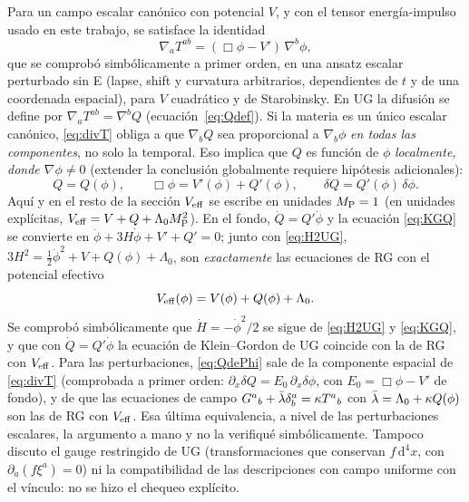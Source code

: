 Para un campo escalar canónico con potencial $V$, y con el tensor energía-impulso usado en este trabajo, se satisface la identidad
\begin{equation}
\nabla_aT^{ab}=(\Box\phi-V')\,\nabla^b\phi,
\label{eq:divT}
\end{equation}
que se comprobó simbólicamente a primer orden, en una ansatz escalar perturbado sin E (lapse, shift y curvatura arbitrarios, dependientes de $t$ y de una coordenada espacial), para $V$ cuadrático y de Starobinsky. En UG la difusión se define por $\nabla_aT^{ab}=\nabla^bQ$ (ecuación~\eqref{eq:Qdef}). Si la materia es un único escalar canónico, \eqref{eq:divT} obliga a que $\nabla_bQ$ sea proporcional a $\nabla_b\phi$ \emph{en todas las componentes}, no solo la temporal. Eso implica que $Q$ es función de $\phi$ \emph{localmente, donde $\nabla\phi\neq0$} (extender la conclusión globalmente requiere hipótesis adicionales):
\begin{equation}
Q=Q(\phi),\qquad \Box\phi=V'(\phi)+Q'(\phi),\qquad \delta Q=Q'(\phi)\,\delta\phi.
\label{eq:QdePhi}
\end{equation}
Aquí y en el resto de la sección $V_{\rm eff}$ se escribe en unidades $M_{\rm P}=1$ (en unidades explícitas, $V_{\rm eff}=V+Q+\Lambda_0M_{\rm P}^2$). En el fondo, $\dot Q=Q'\dot\phi$ y la ecuación \eqref{eq:KGQ} se convierte en $\ddot\phi+3H\dot\phi+V'+Q'=0$; junto con \eqref{eq:H2UG}, $3H^2=\tfrac12\dot\phi^2+V+Q(\phi)+\Lambda_0$, son \emph{exactamente} las ecuaciones de RG con el potencial efectivo
\begin{equation}
V_{\rm eff}(\phi)=V(\phi)+Q(\phi)+\Lambda_0 .
\label{eq:Veff}
\end{equation}
Se comprobó simbólicamente que $\dot H=-\dot\phi^2/2$ se sigue de \eqref{eq:H2UG} y \eqref{eq:KGQ}, y que con $\dot Q=Q'\dot\phi$ la ecuación de Klein--Gordon de UG coincide con la de RG con $V_{\rm eff}$. Para las perturbaciones, \eqref{eq:QdePhi} sale de la componente espacial de \eqref{eq:divT} (comprobada a primer orden: $\partial_x\delta Q=E_0\,\partial_x\delta\phi$, con $E_0=\Box\phi-V'$ de fondo), y de que las ecuaciones de campo $G^a{}_b+\bar\lambda\delta^a_b=\kappa T^a{}_b$ con $\bar\lambda=\Lambda_0+\kappa Q(\phi)$ son las de RG con $V_{\rm eff}$. Esa última equivalencia, a nivel de las perturbaciones escalares, la argumento a mano y no la verifiqué simbólicamente. Tampoco discuto el gauge restringido de UG (transformaciones que conservan $f\,\mathrm d^4x$, con $\partial_a(f\xi^a)=0$) ni la compatibilidad de las descripciones con campo uniforme con el vínculo: no se hizo el chequeo explícito.

